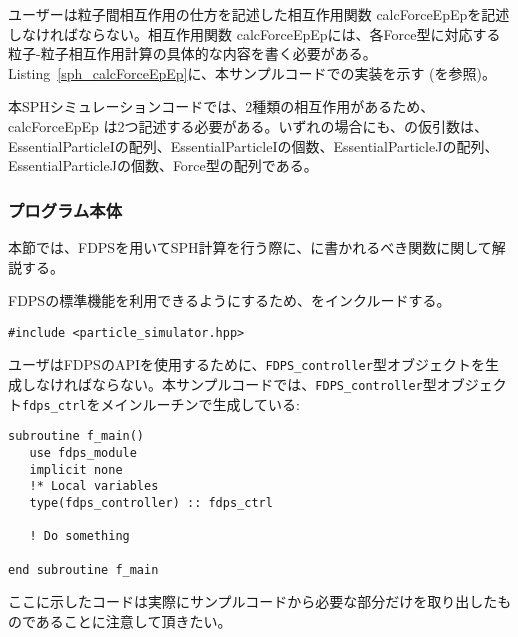 ユーザーは粒子間相互作用の仕方を記述した相互作用関数 calcForceEpEpを記述しなければならない。相互作用関数 calcForceEpEpには、各Force型に対応する粒子-粒子相互作用計算の具体的な内容を書く必要がある。Listing~\ref{sph_calcForceEpEp}に、本サンプルコードでの実装を示す (を参照)。

\ifCpp %

\endifCpp
\ifFtn %

\endifFtn
\ifC %

\endifC

本SPHシミュレーションコードでは、2種類の相互作用があるため、calcForceEpEp は2つ記述する必要がある。いずれの場合にも、\procedure の仮引数は、EssentialParticleIの配列、EssentialParticleIの個数、EssentialParticleJの配列、EssentialParticleJの個数、Force型の配列である。

\subsubsection{プログラム本体}
本節では、FDPSを用いてSPH計算を行う際に、\mainFunc に書かれるべき関数に関して解説する。

\ifCpp%
FDPSの標準機能を利用できるようにするため、をインクルードする。
\begin{lstlisting}[caption=ヘッダーファイル\texttt{particle\_simulator.hpp}のインクルード]
#include <particle_simulator.hpp>
\end{lstlisting}
\endifCpp
\ifFtn %
ユーザはFDPSのAPIを使用するために、\texttt{FDPS\_controller}型オブジェクトを生成しなければならない。本サンプルコードでは、\texttt{FDPS\_controller}型オブジェクト\texttt{fdps\_ctrl}をメインルーチンで生成している:
\begin{lstlisting}[caption=\texttt{fdps\_controller}型オブジェクトの生成]
subroutine f_main()
   use fdps_module
   implicit none
   !* Local variables
   type(fdps_controller) :: fdps_ctrl
    
   ! Do something
   
end subroutine f_main    
\end{lstlisting}
ここに示したコードは実際にサンプルコードから必要な部分だけを取り出したものであることに注意して頂きたい。

